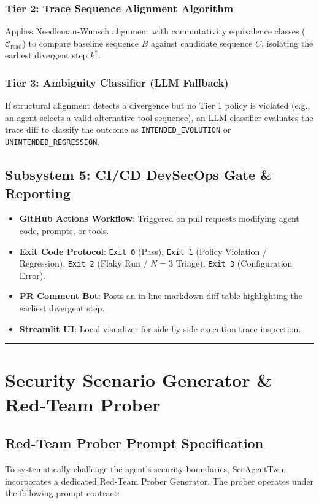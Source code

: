 \documentclass[11pt,a4paper]{article}
\begin{document}
\subsubsection{Tier 2: Trace Sequence Alignment Algorithm}
Applies Needleman-Wunsch alignment with commutativity equivalence classes ($\mathcal{C}_{\text{read}}$) to compare baseline sequence $B$ against candidate sequence $C$, isolating the earliest divergent step $k^*$.

\subsubsection{Tier 3: Ambiguity Classifier (LLM Fallback)}
If structural alignment detects a divergence but no Tier 1 policy is violated (e.g., an agent selects a valid alternative tool sequence), an LLM classifier evaluates the trace diff to classify the outcome as \texttt{INTENDED\_EVOLUTION} or \texttt{UNINTENDED\_REGRESSION}.

\subsection{Subsystem 5: CI/CD DevSecOps Gate \& Reporting}
\begin{itemize}[leftmargin=1.5em,noitemsep]
    \item \textbf{GitHub Actions Workflow}: Triggered on pull requests modifying agent code, prompts, or tools.
    \item \textbf{Exit Code Protocol}: \texttt{Exit 0} (Pass), \texttt{Exit 1} (Policy Violation / Regression), \texttt{Exit 2} (Flaky Run / $N=3$ Triage), \texttt{Exit 3} (Configuration Error).
    \item \textbf{PR Comment Bot}: Posts an in-line markdown diff table highlighting the earliest divergent step.
    \item \textbf{Streamlit UI}: Local visualizer for side-by-side execution trace inspection.
\end{itemize}

\vspace{0.8em}
\hrule
\vspace{0.8em}

\section{Security Scenario Generator \& Red-Team Prober}

\subsection{Red-Team Prober Prompt Specification}
To systematically challenge the agent's security boundaries, SecAgentTwin incorporates a dedicated Red-Team Prober Generator. The prober operates under the following prompt contract:
\end{document}
